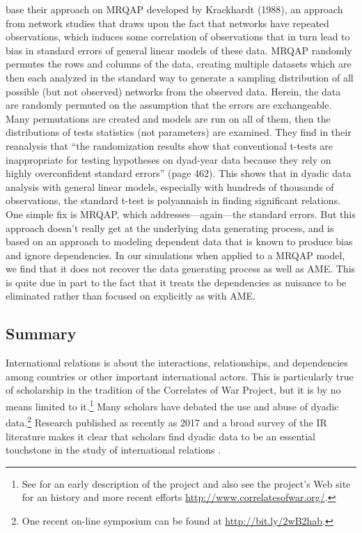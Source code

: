\citet{erikson:etal:2014} base their approach on MRQAP developed by Krackhardt (1988), \nocite{krackhart:1988} an approach from network studies that draws upon the fact that networks have repeated observations, which induces some correlation of observations that in turn lead to bias in standard errors of general linear models of these data. MRQAP randomly permutes the rows and columns of the data, creating multiple datasets which are then each analyzed in the standard way to generate a sampling distribution of all possible (but not observed) networks from the observed data. Herein, the data are randomly permuted on the assumption that the errors are exchangeable.  Many permutations are created and models are run on all of them, then the distributions of tests statistics (not parameters) are examined. They find in their reanalysis that ``the randomization results show that conventional t-tests are inappropriate for
testing hypotheses on dyad-year data because they rely on highly overconfident standard errors'' (page 462).  This shows that in dyadic data analysis with general linear models, especially with hundreds of thousands of observations, the standard t-test is polyannaish in finding significant relations.  One simple fix is MRQAP, which addresses---again---the standard errors. But this approach doesn't really get at the underlying data generating process, and is based on an approach to modeling dependent data that is known to produce bias and ignore dependencies.  In our simulations when applied to a MRQAP model, we find that it does not recover the data generating process as well as AME. This is quite due in part to the fact that it treats the dependencies as nuisance to be eliminated rather than focused on explicitly as with AME. 



\subsection*{Summary}
International relations is about the interactions, relationships, and dependencies among countries or other important international actors. This is particularly true of scholarship in the tradition of the Correlates of War Project, but it is by no means limited to it.\footnote{See \cite{singer:1972} for an early description of the project and also see the project's Web site for an history and more recent efforts \url{http://www.correlatesofwar.org/}.} Many scholars have debated the use and abuse of dyadic data.\footnote{One recent on-line symposium can be found at \url{http://bit.ly/2wB2hab}.} Research published as recently as 2017 and a broad survey of the IR literature makes it clear that scholars find dyadic data to be an essential touchstone in the study of international relations \citep{erikson:pinto:2014,aronow:etal:2015}.

